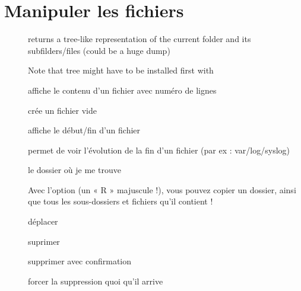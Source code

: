 \documentclass[letterpaper,10pt,french]{sphinxmanual}
\begin{document}
\chapter{Manipuler les fichiers}
\label{\detokenize{03-manipuler:manipuler-les-fichiers}}\label{\detokenize{03-manipuler::doc}}\begin{description}
\item[{}] \leavevmode
returns a tree-like representation of the current folder and its subfilders/files (could be a huge dump)

Note that tree might have to be installed first with 

\item[{}] \leavevmode
affiche le contenu d’un fichier avec numéro de lignes

\item[{}] \leavevmode
crée un fichier vide

\item[{}] \leavevmode
affiche le début/fin d’un fichier

\item[{}] \leavevmode
permet de voir l’évolution de la fin d’un fichier (par ex : var/log/syslog)

\item[{}] \leavevmode
le dossier où je me trouve

\item[{}] \leavevmode
Avec l’option  (un « R » majuscule !), vous pouvez copier un dossier, ainsi que tous les sous-dossiers et fichiers qu’il contient !

\item[{}] \leavevmode
déplacer

\item[{}] \leavevmode
suprimer

\item[{}] \leavevmode
supprimer avec confirmation

\item[{}] \leavevmode
forcer la suppression quoi qu’il arrive


\end{description}
\end{document}
